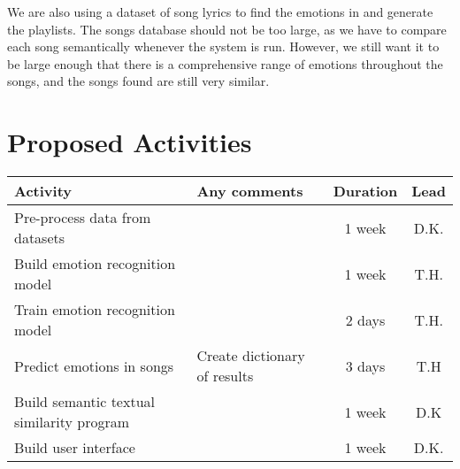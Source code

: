 \documentclass[11pt]{article}
\begin{document}
We are also using a dataset of song lyrics\cite{shah_2021} to find the emotions in and generate the playlists. The songs database should not be too large, as we have to compare each song semantically whenever the system is run. However, we still want it to be large enough that there is a comprehensive range of emotions throughout the songs, and the songs found are still very similar.

\section{Proposed Activities}

\begin{table}[h]
\centering
\begin{tabular}{|l|l|c|c|}
\hline
\textbf{Activity} & \textbf{Any comments} & \textbf{Duration} & \textbf{Lead}\\
\hline
Pre-process data from datasets & & 1 week & D.K. \\
\hline
Build emotion recognition model & & 1 week & T.H. \\
\hline
Train emotion recognition model & & 2 days & T.H. \\
\hline
Predict emotions in songs & Create dictionary of results & 3 days & T.H \\
\hline
Build semantic textual similarity program & & 1 week & D.K \\
\hline
Build user interface & & 1 week & D.K. \\
\hline

\end{tabular}
\end{table}




\end{document}
